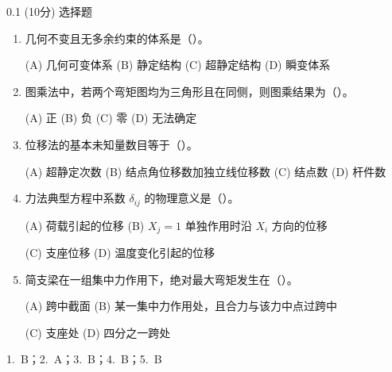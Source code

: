 \begin{question}{0.1}
(10分) 选择题
\begin{enumerate}
\item 几何不变且无多余约束的体系是（\quad）。

  (A) 几何可变体系 \quad (B) 静定结构
  \quad (C) 超静定结构 \quad (D) 瞬变体系

\item 图乘法中，若两个弯矩图均为三角形且在同侧，则图乘结果为（\quad）。

  (A) 正 \quad (B) 负 \quad (C) 零 \quad (D) 无法确定

\item 位移法的基本未知量数目等于（\quad）。

  (A) 超静定次数 \quad (B) 结点角位移数加独立线位移数
  \quad (C) 结点数 \quad (D) 杆件数

\item 力法典型方程中系数 $\delta_{ij}$ 的物理意义是（\quad）。

  (A) 荷载引起的位移\quad
  (B) $X_j=1$ 单独作用时沿 $X_i$ 方向的位移\quad

  (C) 支座位移 \quad (D) 温度变化引起的位移

\item 简支梁在一组集中力作用下，绝对最大弯矩发生在（\quad）。

  (A) 跨中截面 \quad
  (B) 某一集中力作用处，且合力与该力中点过跨中\quad

  (C) 支座处 \quad (D) 四分之一跨处
\end{enumerate}
\end{question}

\begin{solution}
1.~B；2.~A；3.~B；4.~B；5.~B
\end{solution}
